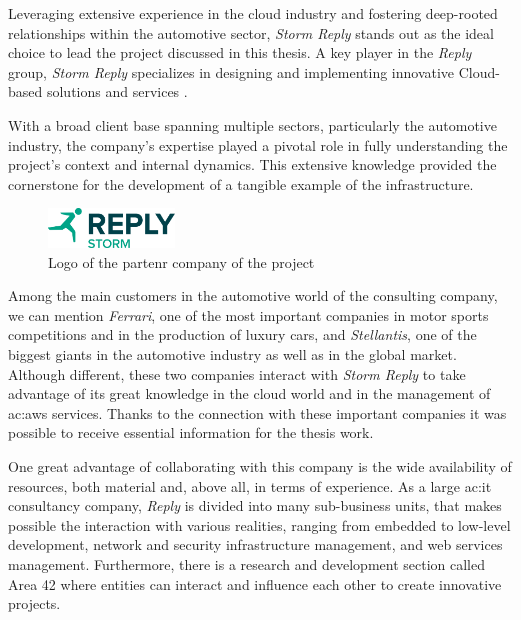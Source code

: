 Leveraging extensive experience in the cloud industry and fostering deep-rooted relationships within the automotive sector, \textit{Storm Reply} stands out as the ideal choice to lead the project discussed in this thesis. A key player in the \textit{Reply} group, \textit{Storm Reply} specializes in designing and implementing innovative Cloud-based solutions and services \cite{StormReplySite}. 

With a broad client base spanning multiple sectors, particularly the automotive industry, the company's expertise played a pivotal role in fully understanding the project's context and internal dynamics. This extensive knowledge provided the cornerstone for the development of a tangible example of the infrastructure.

\begin{figure}[h]  %
  \centering
  \includegraphics[width=0.3\textwidth]{images/Storm_Reply_logo.png}  %
  \caption{Logo of the partenr company of the project}
  \label{fig:StormReplyLogo}
\end{figure}

Among the main customers in the automotive world of the consulting company, we can mention \textit{Ferrari}, one of the most important companies in motor sports competitions and in the production of luxury cars, and \textit{Stellantis}, one of the biggest giants in the automotive industry as well as in the global market. Although different, these two companies interact with \textit{Storm Reply} to take advantage of its great knowledge in the cloud world and in the management of \gls{ac:aws} services. Thanks to the connection with these important companies it was possible to receive essential information for the thesis work.

One great advantage of collaborating with this company is the wide availability of resources, both material and, above all, in terms of experience. As a large \gls{ac:it} consultancy company, \textit{Reply} is divided into many sub-business units, that makes possible the interaction with various realities, ranging from embedded to low-level development, network and security infrastructure management, and web services management. Furthermore, there is a research and development section called Area 42 where entities can interact and influence each other to create innovative projects.

